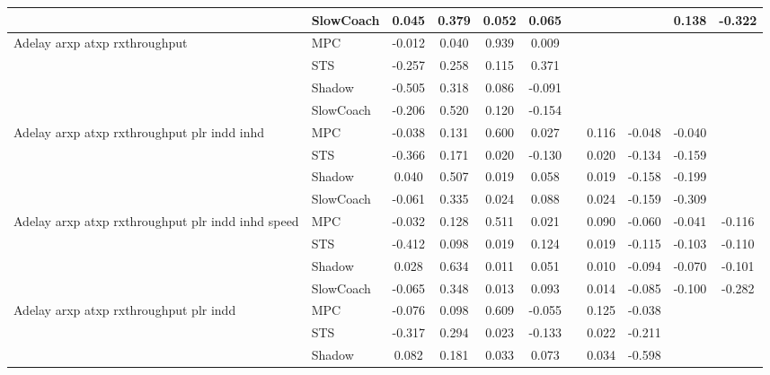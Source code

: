 \begin{tabular}{|l|l|*{9}{c|}}
                              & SlowCoach &    0.045 &     0.379 &     0.052 &  0.065 &     &     &      &   0.138 &   -0.322 \\
\midrule
Adelay arxp atxp rxthroughput    & MPC &   -0.012 &     0.040 &     0.939 &  0.009 &     &     &      &      &       \\
                              & STS &   -0.257 &     0.258 &     0.115 &  0.371 &     &     &      &      &       \\
                              & Shadow &   -0.505 &     0.318 &     0.086 & -0.091 &     &     &      &      &       \\
                              & SlowCoach &   -0.206 &     0.520 &     0.120 & -0.154 &     &     &      &      &       \\
\midrule
Adelay arxp atxp rxthroughput plr indd inhd    & MPC &   -0.038 &     0.131 &     0.600 &  0.027 &     &  0.116 &  -0.048 &  -0.040 &       \\
                              & STS &   -0.366 &     0.171 &     0.020 & -0.130 &     &  0.020 &  -0.134 &  -0.159 &       \\
                              & Shadow &    0.040 &     0.507 &     0.019 &  0.058 &     &  0.019 &  -0.158 &  -0.199 &       \\
                              & SlowCoach &   -0.061 &     0.335 &     0.024 &  0.088 &     &  0.024 &  -0.159 &  -0.309 &       \\
\midrule
Adelay arxp atxp rxthroughput plr indd inhd speed    & MPC &   -0.032 &     0.128 &     0.511 &  0.021 &     &  0.090 &  -0.060 &  -0.041 &   -0.116 \\
                              & STS &   -0.412 &     0.098 &     0.019 &  0.124 &     &  0.019 &  -0.115 &  -0.103 &   -0.110 \\
                              & Shadow &    0.028 &     0.634 &     0.011 &  0.051 &     &  0.010 &  -0.094 &  -0.070 &   -0.101 \\
                              & SlowCoach &   -0.065 &     0.348 &     0.013 &  0.093 &     &  0.014 &  -0.085 &  -0.100 &   -0.282 \\
\midrule
Adelay arxp atxp rxthroughput plr indd    & MPC &   -0.076 &     0.098 &     0.609 & -0.055 &     &  0.125 &  -0.038 &      &       \\
                              & STS &   -0.317 &     0.294 &     0.023 & -0.133 &     &  0.022 &  -0.211 &      &       \\
                              & Shadow &    0.082 &     0.181 &     0.033 &  0.073 &     &  0.034 &  -0.598 &      &       \\

\end{tabular}
